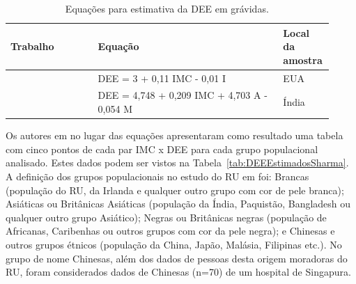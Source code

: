 \begin{table}[!ht]
\begin{center}
\caption{Equações para estimativa da DEE em grávidas.}
\label{tab:equacoesEstimativaDEE}
\begin{tabular}{|p{0.26\linewidth}|p{0.55\linewidth}|p{0.105\linewidth}|}
\hline
\textbf{Trabalho} & \textbf{Equação} & \textbf{Local da amostra}\\
\hline\hline
\cite{Clinkscales2007} & DEE = 3 + 0,11 IMC - 0,01 I & EUA \\
\cite{Hazarika2016} & DEE = 4,748 + 0,209 IMC + 4,703 A - 0,054 M & Índia \\
\hline
\end{tabular}
\end{center}
\end{table}

Os autores em \cite{Sharma2011} no lugar das equações apresentaram como resultado uma tabela com cinco pontos de cada par \acrshort{IMC} x \acrshort{DEE} para cada grupo populacional analisado. Estes dados podem ser vistos na Tabela~\ref{tab:DEEEstimadosSharma}. A definição dos grupos populacionais no estudo do \acrshort{RU} em \cite{Sharma2011} foi: Brancas (população do \acrlong{RU}, da Irlanda e qualquer outro grupo com cor de pele branca); Asiáticas ou Britânicas Asiáticas (população da Índia, Paquistão, Bangladesh ou qualquer outro grupo Asiático); Negras ou Britânicas negras (população de Africanas, Caribenhas ou outros grupos com cor da pele negra); e Chinesas e outros grupos étnicos (população da China, Japão, Malásia, Filipinas etc.). No grupo de nome Chinesas, além dos dados de pessoas desta origem moradoras do \acrshort{RU}, foram considerados dados de Chinesas (n=70) de um hospital de Singapura.

